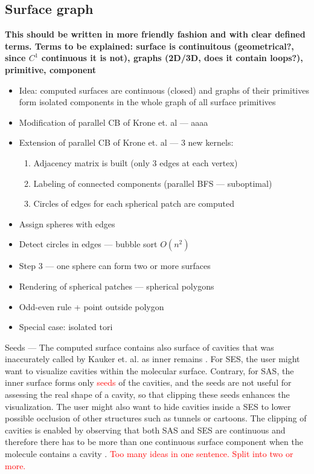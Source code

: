 \subsection{Surface graph}
\label{sec:graph}

\textbf{This should be written in more friendly fashion and with clear defined terms.
Terms to be explained: surface is continuitous (geometrical?, since $C^1$ continuous it is not), graphs (2D/3D, does it contain loops?), primitive, component }   
\begin{itemize}
  \item Idea: computed surfaces are continuous (closed) and graphs of their primitives form isolated components in the whole graph of all surface primitives
  \item Modification of parallel CB of Krone et. al --- aaaa
  \item Extension of parallel CB of Krone et. al --- 3 new kernels:
	\begin{enumerate}
	  \item Adjacency matrix is built (only 3 edges at each vertex)
    \item Labeling of connected components (parallel BFS --- suboptimal)
    \item Circles of edges for each spherical patch are computed
  \end{enumerate}
  \item Assign spheres with edges
  \item Detect circles in edges --- bubble sort $O(n^2)$
  \item Step 3 --- one sphere can form two or more surfaces
  \item Rendering of spherical patches --- spherical polygons
  \item Odd-even rule + point outside polygon
  \item Special case: isolated tori
\end{itemize}

Seeds --- The computed surface contains also surface of cavities that was inaccurately called by Kauker et. al. as inner remains \cite{kauker2013rendering}.
For SES, the user might want to visualize cavities within the molecular surface.
Contrary, for SAS, the inner surface forms only \textcolor{red}{seeds} of the cavities, and the seeds are not useful for assessing the real shape of a cavity, so that clipping these seeds enhances the visualization.
The user might also want to hide cavities inside a SES to lower possible occlusion of other structures such as tunnels or cartoons.
The clipping of cavities is enabled by observing that both SAS and SES are continuous and therefore there has to be more than one continuous surface component when the molecule contains a cavity \cite{borland2011ambient}.
\textcolor{red}{Too many ideas in one sentence. Split into two or more.}

